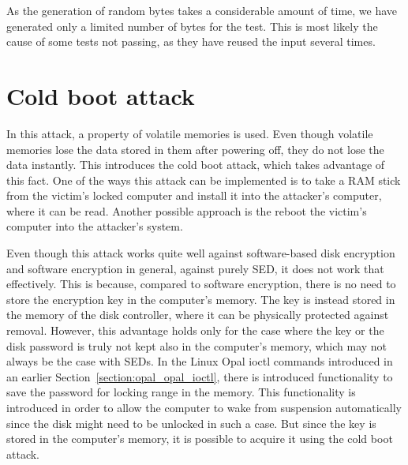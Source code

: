 As the generation of random bytes takes a considerable amount of time, we have generated only a limited number of bytes for the test. This is most likely the cause of some tests not passing, as they have reused the input several times.



\section{Cold boot attack}
\label{cold_boot_attack}

In this attack, a property of volatile memories is used. Even though volatile memories lose the data stored in them after powering off, they do not lose the data instantly. This introduces the cold boot attack, which takes advantage of this fact. One of the ways this attack can be implemented is to take a RAM stick from the victim's locked computer and install it into the attacker's computer, where it can be read. Another possible approach is the reboot the victim's computer into the attacker's system.

\REPLACEME

Even though this attack works quite well against software-based disk encryption and software encryption in general, against purely SED, it does not work that effectively. This is because, compared to software encryption, there is no need to store the encryption key in the computer's memory. The key is instead stored in the memory of the disk controller, where it can be physically protected against removal.
However, this advantage holds only for the case where the key or the disk password is truly not kept also in the computer's memory, which may not always be the case with SEDs. In the Linux Opal ioctl commands introduced in an earlier Section~\ref{section:opal_opal_ioctl}, there is introduced functionality to save the password for locking range in the memory. This functionality is introduced in order to allow the computer to wake from suspension automatically since the disk might need to be unlocked in such a case. But since the key is stored in the computer's memory, it is possible to acquire it using the cold boot attack.


